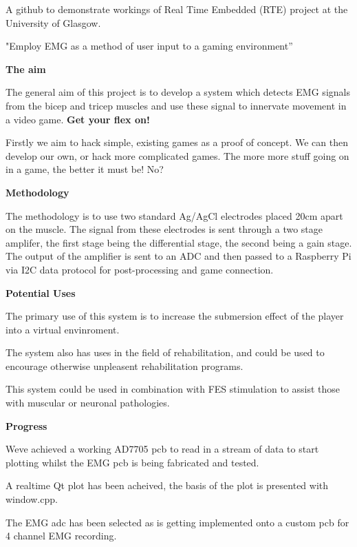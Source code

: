A github to demonstrate workings of Real Time Embedded (R\+TE) project at the University of Glasgow.

"Employ E\+MG as a method of user input to a gaming environment”

{\bfseries The aim}

The general aim of this project is to develop a system which detects E\+MG signals from the bicep and tricep muscles and use these signal to innervate movement in a video game. {\bfseries Get your flex on!}

Firstly we aim to hack simple, existing games as a proof of concept. We can then develop our own, or hack more complicated games. The more more stuff going on in a game, the better it must be! No?

{\bfseries Methodology}

The methodology is to use two standard Ag/\+Ag\+Cl electrodes placed 20cm apart on the muscle. The signal from these electrodes is sent through a two stage amplifer, the first stage being the differential stage, the second being a gain stage. The output of the amplifier is sent to an A\+DC and then passed to a Raspberry Pi via I2C data protocol for post-\/processing and game connection.

{\bfseries Potential Uses}

The primary use of this system is to increase the submersion effect of the player into a virtual envinroment.

The system also has uses in the field of rehabilitation, and could be used to encourage otherwise unpleasent rehabilitation programs.

This system could be used in combination with F\+ES stimulation to assist those with muscular or neuronal pathologies.

{\bfseries Progress}

We\textquotesingle{}ve achieved a working A\+D7705 pcb to read in a stream of data to start plotting whilst the E\+MG pcb is being fabricated and tested.

A realtime Qt plot has been acheived, the basis of the plot is presented with window.\+cpp.

The E\+MG adc has been selected as is getting implemented onto a custom pcb for 4 channel E\+MG recording. 